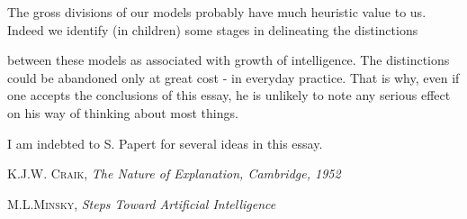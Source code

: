 \documentclass{article}
\begin{document}
The gross divisions of our models probably have much heuristic value to us. Indeed we identify (in children) some stages in delineating the distinctions

\newpage

between these models as associated with growth of intelligence. The distinctions could be abandoned only at great cost - in everyday practice. That is why, even if one accepts the conclusions of this essay, he is unlikely to note any serious effect on his way of thinking about most things.

I am indebted to S. Papert for several ideas in this essay.

\begin{thebibliography}{xx}
  \textsc{K.J.W. Craik}, \textit{The Nature of Explanation, Cambridge, 1952}
  
  \textsc{M.L.Minsky}, \textit{Steps Toward Artificial Intelligence}
\end{thebibliography}
\end{document}
